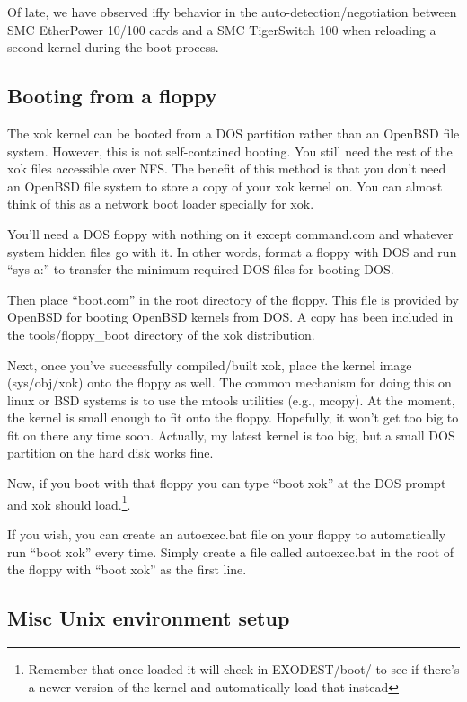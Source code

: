 \documentclass[11pt]{article}
\begin{document}
Of late, we have observed iffy behavior in the auto-detection/negotiation
between SMC EtherPower 10/100 cards and a SMC TigerSwitch 100 when reloading
a second kernel during the boot process.

\subsection {Booting from a floppy}

The xok kernel can be booted from a DOS partition rather than an OpenBSD
file system.  However, this is not self-contained booting.  You still need
the rest of the xok files accessible over NFS.  The benefit of this method
is that you don't need an OpenBSD file system to store a copy of your xok
kernel on.  You can almost think of this as a network boot loader specially
for xok.

You'll need a DOS floppy with nothing on it except command.com and
whatever system hidden files go with it.  In other words, format a
floppy with DOS and run ``sys a:'' to transfer the minimum required DOS
files for booting DOS.

Then place ``boot.com'' in the root directory of the floppy.  This file is
provided by OpenBSD for booting OpenBSD kernels from DOS.  A copy has
been included in the tools/floppy\_boot directory of the xok distribution.

Next, once you've successfully compiled/built xok, place the kernel image
(sys/obj/xok) onto the floppy as well.  The common mechanism for doing this
on linux or BSD systems is to use the mtools utilities (e.g., mcopy).  At
the moment, the kernel is small enough to fit onto the floppy.  Hopefully,
it won't get too big to fit on there any time soon.  Actually, my latest
kernel is too big, but a small DOS partition on the hard disk works fine.

Now, if you boot with that floppy you can type ``boot xok'' at the DOS
prompt and xok should load.\footnote {Remember that once loaded it
will check in EXODEST/boot/ to see if there's a newer version of the
kernel and automatically load that instead}.

If you wish, you can create an autoexec.bat file on your floppy to
automatically run ``boot xok'' every time.  Simply create a file called
autoexec.bat in the root of the floppy with ``boot xok'' as the first
line.

\subsection {Misc Unix environment setup}
\end{document}

